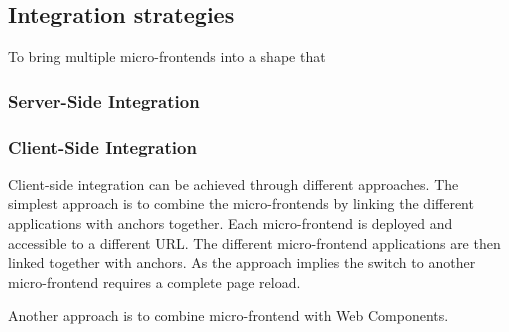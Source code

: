 \subsection{Integration strategies}

To bring multiple micro-frontends into a shape that 

\subsubsection{Server-Side Integration}



\subsubsection{Client-Side Integration}

Client-side integration can be achieved through different approaches. The simplest approach is to combine the micro-frontends by linking the different applications with anchors together. Each micro-frontend is deployed and accessible to a different URL. The different micro-frontend applications are then linked together with anchors. As the approach implies the switch to another micro-frontend requires a complete page reload. 

Another approach is to combine micro-frontend with Web Components.